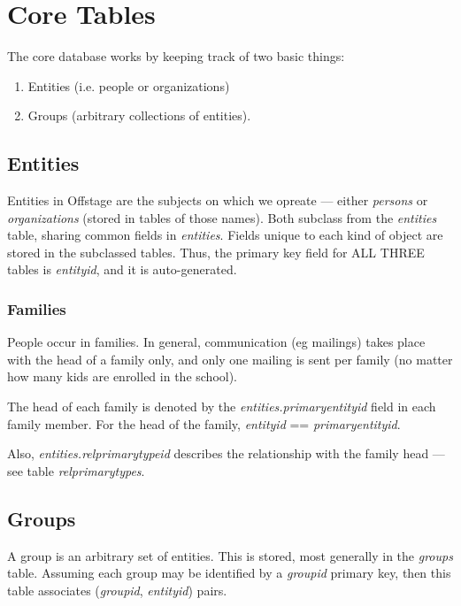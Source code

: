 \section{Core Tables}

The core database works by keeping track of two basic things:

\begin{enumerate}
\item Entities (i.e. people or organizations)
\item Groups (arbitrary collections of entities).
\end{enumerate}

\subsection{Entities}

Entities in Offstage are the subjects on which we opreate --- either \emph{persons} or \emph{organizations} (stored in tables of those names).  Both subclass from the \emph{entities} table, sharing common fields in \emph{entities}.  Fields unique to each kind of object are stored in the subclassed tables.  Thus, the primary key field for ALL THREE tables is \emph{entityid}, and it is auto-generated.

\subsubsection{Families}

People occur in families.  In general, communication (eg mailings) takes place with the head of a family only, and only one mailing is sent per family (no matter how many kids are enrolled in the school).

The head of each family is denoted by the \emph{entities.primaryentityid} field in each family member.  For the head of the family, \emph{entityid} == \emph{primaryentityid}.

Also, \emph{entities.relprimarytypeid} describes the relationship with the family head --- see table \emph{relprimarytypes}.

\subsection{Groups}

A group is an arbitrary set of entities.  This is stored, most generally in the \emph{groups} table.  Assuming each group may be identified by a \emph{groupid} primary key, then this table associates (\emph{groupid}, \emph{entityid}) pairs.

